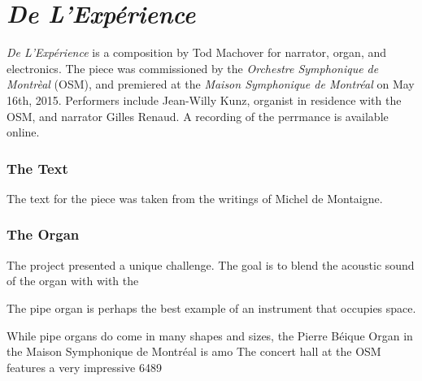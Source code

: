 \clearpage
\chapter{\textit{De L'Exp\'{e}rience}}
\label{ch:experience}

\textit{De L'Exp\'{e}rience} is a composition by Tod Machover for
narrator, organ, and electronics. The piece was commissioned by the
\textit{Orchestre Symphonique de Montr\`{e}al} (OSM), and premiered at
the \textit{Maison Symphonique de Montr\'{e}al} on May 16th,
2015. Performers include Jean-Willy Kunz, organist in residence with
the OSM, and narrator Gilles Renaud. A recording of the perrmance is
available
online.

\subsection{The Text}
\label{sec:text}
The text for the piece was taken from the writings of Michel de Montaigne. 

\subsection{The Organ}
\label{sec:organ}
The project presented a unique challenge. The goal is to blend the
acoustic sound of the organ with with the 


The pipe organ is perhaps the best example of an instrument that
occupies space.

While pipe organs do come in many shapes and sizes,
the Pierre B\'{e}ique Organ in the Maison Symphonique de Montr\'{e}al
is amo
The concert hall at the OSM features a very impressive 
6489


